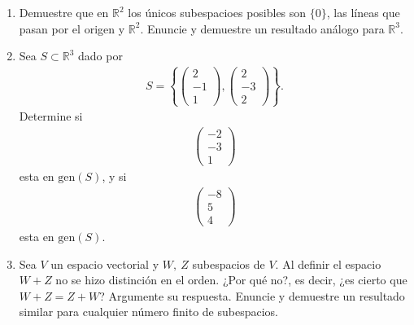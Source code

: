 \documentclass[11pt,letterpaper]{article}
\newcommand{\mR}{\mathbb{R}}
\begin{document}
\begin{enumerate}
\item Demuestre que en $\mR^2$ los únicos subespacioes posibles son $\{0\}$, las líneas que pasan por el origen y $\mR^2$. Enuncie y demuestre un resultado análogo para $\mR^3$.

\item Sea $S\subset \mR^3$ dado por 
\begin{align*}
S=\left\{\begin{pmatrix}
2\\
-1\\
1
\end{pmatrix}, \begin{pmatrix}
2\\
-3\\
2
\end{pmatrix} \right\}.
\end{align*}
Determine si \begin{align*}
\begin{pmatrix}
-2\\
-3\\
1
\end{pmatrix}
\end{align*}
esta en $\text{gen}(S)$, y si \begin{align*}
\begin{pmatrix}
-8\\
5\\
4
\end{pmatrix}
\end{align*}
esta en $\text{gen}(S)$.


\item Sea $V$ un espacio vectorial y $W, \ Z$ subespacios de $V$. Al definir el espacio $W+Z$ no se hizo distinción en el orden. ¿Por qué no?, es decir, ¿es cierto que
$W + Z = Z + W$? Argumente su respuesta. Enuncie y demuestre un resultado similar para cualquier número finito de subespacios.


\end{enumerate}
\end{document}
